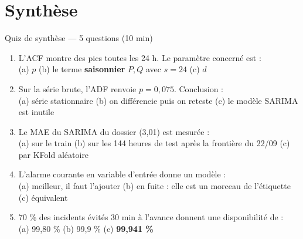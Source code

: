 \section{Synthèse}

\begin{frame}{Quiz de synthèse --- 5 questions (10 min)}
\begin{qbox}
\begin{enumerate}
\item L'ACF montre des pics toutes les 24 h. Le paramètre concerné est :\\
(a) $p$ \quad (b) le terme \textbf{saisonnier} $P,Q$ avec $s=24$ \quad
(c) $d$
\item Sur la série brute, l'ADF renvoie $p = 0{,}075$. Conclusion :\\
(a) série stationnaire \quad (b) on différencie puis on reteste \quad
(c) le modèle SARIMA est inutile
\item Le MAE du SARIMA du dossier (3,01) est mesurée :\\
(a) sur le train \quad (b) sur les 144 heures de test après la
frontière du 22/09 \quad (c) par KFold aléatoire
\item L'alarme courante en variable d'entrée donne un modèle :\\
(a) meilleur, il faut l'ajouter \quad (b) en fuite : elle est un
morceau de l'étiquette \quad (c) équivalent
\item 70 \% des incidents évités 30 min à l'avance donnent une
disponibilité de :\\
(a) 99,80 \% \quad (b) 99,9 \% \quad (c) \textbf{99,941 \%}
\end{enumerate}
\end{qbox}
\end{frame}

